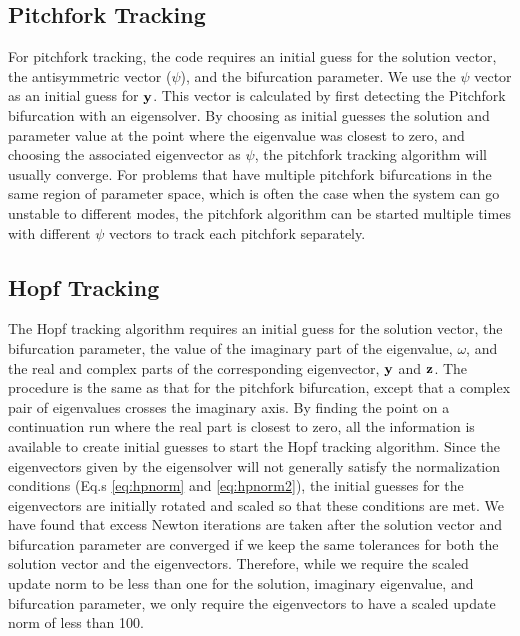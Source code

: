 \subsection{Pitchfork Tracking} \label{sec:PT}
For pitchfork tracking, the code requires an initial guess for the solution vector, the antisymmetric vector ($\psi$), and the bifurcation parameter. We use the $\psi$ vector as an initial guess for ${\bf y}$. This vector is calculated by first detecting the Pitchfork bifurcation with an eigensolver. By choosing as initial guesses the solution and parameter value at the point where the eigenvalue was closest to zero, and choosing the associated eigenvector as $\psi$, the pitchfork tracking algorithm will usually converge. For problems that have multiple pitchfork bifurcations in the same region of parameter space, which is often the case when the system can go unstable to different modes, the pitchfork algorithm can be started multiple times with different $\psi$ vectors to track each pitchfork separately.

\subsection{Hopf Tracking} \label{sec:HT}
The Hopf tracking algorithm requires an initial guess for the solution vector, the bifurcation parameter, the value of the imaginary part of the eigenvalue, $\omega$, and the real and complex parts of the corresponding eigenvector, ${\bf y}$ and ${\bf z}$. The procedure is the same as that for the pitchfork bifurcation, except that a complex pair of eigenvalues crosses the imaginary axis. By finding the point on a continuation run where the real part is closest to zero, all the information is available to create initial guesses to start the Hopf tracking algorithm. Since the eigenvectors given by the eigensolver will not generally satisfy the normalization conditions (Eq.s \ref{eq:hpnorm} and \ref{eq:hpnorm2}), the initial guesses for the eigenvectors are initially rotated and scaled so that these conditions are met. We have found that excess Newton iterations are taken after the solution vector and bifurcation parameter are converged if we keep the same tolerances for both the solution vector and the eigenvectors. Therefore, while we require the scaled update norm to be less than one for the solution, imaginary eigenvalue, and bifurcation parameter, we only require the eigenvectors to have a scaled update norm of less than 100.

